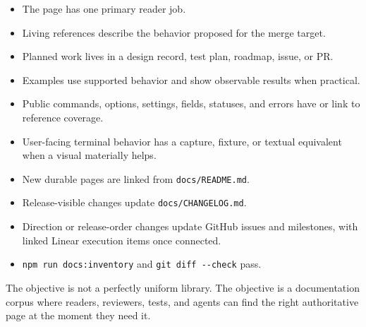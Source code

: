 \begin{itemize}
\tightlist
\item
  The page has one primary reader job.
\item
  Living references describe the behavior proposed for the merge target.
\item
  Planned work lives in a design record, test plan, roadmap, issue, or PR.
\item
  Examples use supported behavior and show observable results when practical.
\item
  Public commands, options, settings, fields, statuses, and errors have or link to reference coverage.
\item
  User-facing terminal behavior has a capture, fixture, or textual equivalent when a visual materially helps.
\item
  New durable pages are linked from \texttt{d\allowbreak{}o\allowbreak{}c\allowbreak{}s\allowbreak{}/\allowbreak{}R\allowbreak{}E\allowbreak{}A\allowbreak{}D\allowbreak{}M\allowbreak{}E\allowbreak{}.\allowbreak{}m\allowbreak{}d}.
\item
  Release-visible changes update \texttt{d\allowbreak{}o\allowbreak{}c\allowbreak{}s\allowbreak{}/\allowbreak{}C\allowbreak{}H\allowbreak{}A\allowbreak{}N\allowbreak{}G\allowbreak{}E\allowbreak{}L\allowbreak{}O\allowbreak{}G\allowbreak{}.\allowbreak{}m\allowbreak{}d}.
\item
  Direction or release-order changes update GitHub issues and milestones, with linked Linear execution items once connected.
\item
  \texttt{n\allowbreak{}p\allowbreak{}m\allowbreak{} \allowbreak{}r\allowbreak{}u\allowbreak{}n\allowbreak{} \allowbreak{}d\allowbreak{}o\allowbreak{}c\allowbreak{}s\allowbreak{}:\allowbreak{}i\allowbreak{}n\allowbreak{}v\allowbreak{}e\allowbreak{}n\allowbreak{}t\allowbreak{}o\allowbreak{}r\allowbreak{}y} and \texttt{g\allowbreak{}i\allowbreak{}t\allowbreak{} \allowbreak{}d\allowbreak{}i\allowbreak{}f\allowbreak{}f\allowbreak{} \allowbreak{}-\allowbreak{}-\allowbreak{}c\allowbreak{}h\allowbreak{}e\allowbreak{}c\allowbreak{}k} pass.
\end{itemize}

The objective is not a perfectly uniform library. The objective is a documentation corpus where readers, reviewers, tests, and agents can find the right authoritative page at the moment they need it.

